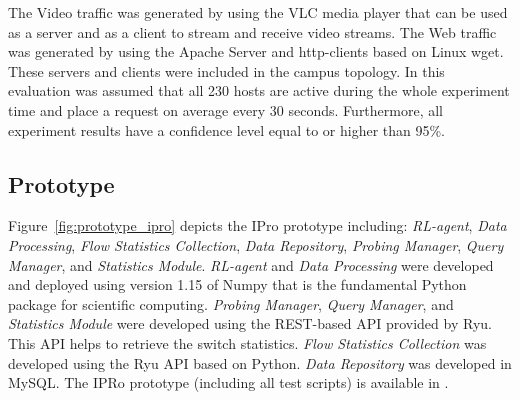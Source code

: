The Video traffic was generated by using the VLC media player \cite{Muller:2011:VMP:2072298.2072429} that can be used as a server and as a client to stream and receive video streams. The Web traffic was generated by using the Apache Server \cite{Mockus:2000:CSO:337180.337209} and http-clients based on Linux wget. These servers and clients were included in the campus topology. In this evaluation was assumed that all 230 hosts are active during the whole experiment time and place a request on average every 30 seconds. Furthermore, all experiment results have a confidence level equal to or higher than 95\%.
\subsection{Prototype}
\label{subsec:prototype}

Figure~\ref{fig:prototype_ipro} depicts the IPro prototype including: \textit{RL-agent}, \textit{Data Processing}, \textit{Flow Statistics Collection}, \textit{Data Repository}, \textit{Probing Manager}, \textit{Query Manager}, and \textit{Statistics Module}. \textit{RL-agent} and \textit{Data Processing} were developed and deployed using version 1.15 of Numpy that is the fundamental Python package for scientific computing. \textit{Probing Manager}, \textit{Query Manager}, and \textit{Statistics Module} were developed using the REST-based API provided by Ryu. This API helps to retrieve the switch statistics. \textit{Flow Statistics Collection} was developed using the Ryu API based on Python. \textit{Data Repository} was developed in MySQL. The IPRo prototype (including all test scripts) is available in \cite{castillo:ipro}.

